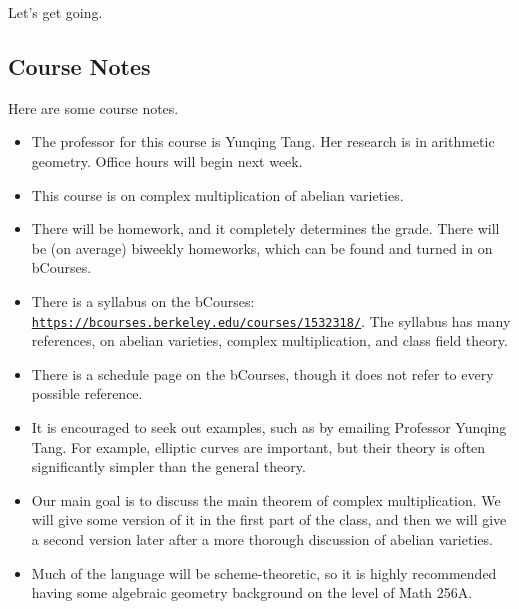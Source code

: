 \documentclass[../notes.tex]{subfiles}
\begin{document}
Let's get going.

\subsection{Course Notes}
Here are some course notes.
\begin{itemize}
	\item The professor for this course is Yunqing Tang. Her research is in arithmetic geometry. Office hours will begin next week.
	\item This course is on complex multiplication of abelian varieties.
	\item There will be homework, and it completely determines the grade. There will be (on average) biweekly homeworks, which can be found and turned in on bCourses.
	\item There is a syllabus on the bCourses: \href{https://bcourses.berkeley.edu/courses/1532318/}{\texttt{https://bcourses.berkeley.edu/courses/1532318/}}. The syllabus has many references, on abelian varieties, complex multiplication, and class field theory.
	\item There is a schedule page on the bCourses, though it does not refer to every possible reference.
	\item It is encouraged to seek out examples, such as by emailing Professor Yunqing Tang. For example, elliptic curves are important, but their theory is often significantly simpler than the general theory.
	\item Our main goal is to discuss the main theorem of complex multiplication. We will give some version of it in the first part of the class, and then we will give a second version later after a more thorough discussion of abelian varieties.
	\item Much of the language will be scheme-theoretic, so it is highly recommended having some algebraic geometry background on the level of Math 256A.
\end{itemize}
\end{document}
